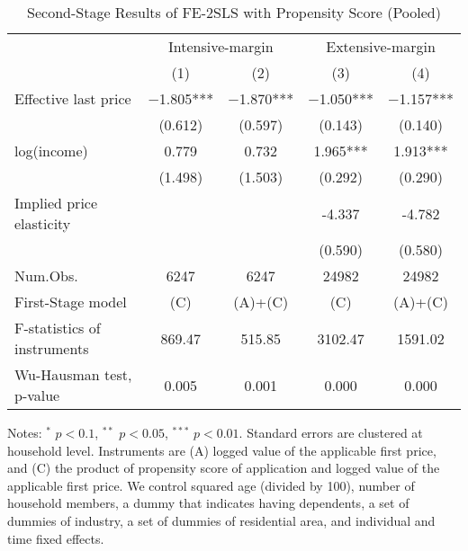 \begin{table}

\caption{Second-Stage Results of FE-2SLS with Propensity Score (Pooled) \label{tab:psiv-pool-stage2}}
\centering
\begin{threeparttable}
\begin{tabular}[t]{lcccc}
\toprule
\multicolumn{1}{c}{ } & \multicolumn{2}{c}{Intensive-margin} & \multicolumn{2}{c}{Extensive-margin} \\
\cmidrule(l{3pt}r{3pt}){2-3} \cmidrule(l{3pt}r{3pt}){4-5}
  & (1) & (2) & (3) & (4)\\
\midrule
Effective last price & \num{-1.805}*** & \num{-1.870}*** & \num{-1.050}*** & \num{-1.157}***\\
 & (\num{0.612}) & (\num{0.597}) & (\num{0.143}) & (\num{0.140})\\
log(income) & \num{0.779} & \num{0.732} & \num{1.965}*** & \num{1.913}***\\
 & (\num{1.498}) & (\num{1.503}) & (\num{0.292}) & (\num{0.290})\\
\midrule
Implied price elasticity &  &  & -4.337 & -4.782\\
 &  &  & (0.590) & (0.580)\\
Num.Obs. & \num{6247} & \num{6247} & \num{24982} & \num{24982}\\
First-Stage model & (C) & (A)+(C) & (C) & (A)+(C)\\
F-statistics of instruments & 869.47 & 515.85 & 3102.47 & 1591.02\\
Wu-Hausman test, p-value & 0.005 & 0.001 & 0.000 & 0.000\\
\bottomrule
\end{tabular}
\begin{tablenotes}
\item Notes: $^{*}$ $p < 0.1$, $^{**}$ $p < 0.05$, $^{***}$ $p < 0.01$. Standard errors are clustered at household level. Instruments are (A) logged value of the applicable first price, and (C) the product of propensity score of application and logged value of the applicable first price. We control squared age (divided by 100), number of household members, a dummy that indicates having dependents, a set of dummies of industry, a set of dummies of residential area, and individual and time fixed effects.
\end{tablenotes}
\end{threeparttable}
\end{table}
